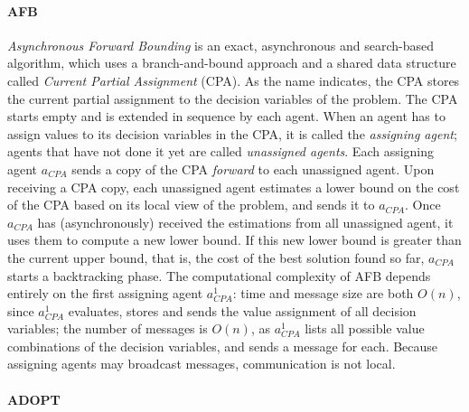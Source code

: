 \paragraph{AFB}

\emph{Asynchronous Forward Bounding} \cite{gershman2009afb} is an exact, asynchronous and
search-based algorithm, which uses a branch-and-bound approach and a shared data structure
called \emph{Current Partial Assignment} (CPA). As the name indicates, the CPA stores the
current partial assignment to the decision variables of the problem. The CPA starts empty
and is extended in sequence by each agent. When an agent has to assign values to its
decision variables in the CPA, it is called the \emph{assigning agent}; agents that
have not done it yet are called \emph{unassigned agents}. Each assigning agent $a_{CPA}$
sends a copy of the CPA \emph{forward} to each unassigned agent. Upon receiving a CPA
copy, each unassigned agent estimates a lower bound on the cost of the CPA based on its
local view of the problem, and sends it to $a_{CPA}$. Once $a_{CPA}$ has (asynchronously)
received the estimations from all unassigned agent, it uses them to compute a new lower
bound. If this new lower bound is greater than the current upper bound, that is, the cost
of the best solution found so far, $a_{CPA}$ starts a backtracking phase.
The computational complexity of AFB depends entirely on the first assigning agent
$a_{CPA}^1$: time and message size are both $O(n)$, since $a_{CPA}^1$ evaluates, stores
and sends the value assignment of all decision variables; the number of messages is
$O(n)$, as $a_{CPA}^1$ lists all possible value combinations of the decision variables,
and sends a message for each. Because assigning agents may broadcast messages,
communication is not local.

\paragraph{ADOPT}

